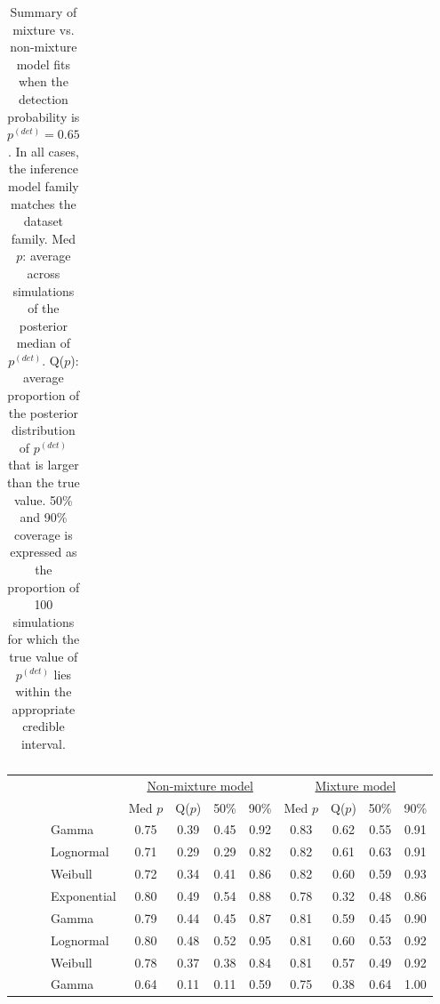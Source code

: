\documentclass[useAMS,usenatbib,referee,12pt]{article}
\newcommand{\pdet}{p^{(det)}}
\begin{document}
\begin{table}[ht]
\begin{tabular}{l|l|l|l|cccc|cccc}
   \hline
\end{tabular}
\caption{Summary of mixture vs. non-mixture model fits when the detection probability is $\pdet =0.65$.  
In all cases, the inference model family matches the dataset family.  
Med $p$: average across simulations of the posterior median of $\pdet$.  
Q($p$): average proportion of the posterior distribution of $\pdet$ that is larger than the true value.  
50\% and 90\% coverage is expressed as the proportion of 100 simulations for which the true value of $\pdet$ lies within the appropriate credible interval.}
\label{tbl:mix65}
\end{table}



\begin{table}[ht]\centering\footnotesize
\begin{tabular}{l|l|l|l|cccc|cccc}
 \multicolumn{4}{c|}{ } & \multicolumn{4}{c|}{\underline{Non-mixture model}} & \multicolumn{4}{c}{\underline{Mixture model}} \\
 \multicolumn{4}{c|}{ } & Med $p$ & Q($p$) & 50\% & 90\% & Med $p$ & Q($p$) & 50\% & 90\% \\ 
  \hline
  \hline
 \parbox[t]{2mm}{} & \parbox[t]{2mm}{} & \parbox[t]{2mm}{} & Gamma & 0.75 & 0.39 & 0.45 & 0.92 & 0.83 & 0.62 & 0.55 & 0.91 \\ 
   &  &  & Lognormal & 0.71 & 0.29 & 0.29 & 0.82 & 0.82 & 0.61 & 0.63 & 0.91 \\ 
   &  &  & Weibull & 0.72 & 0.34 & 0.41 & 0.86 & 0.82 & 0.60 & 0.59 & 0.93 \\ 
    &  &  & Exponential & 0.80 & 0.49 & 0.54 & 0.88 & 0.78 & 0.32 & 0.48 & 0.86 \\ 
 & & \parbox[t]{2mm}{} & Gamma & 0.79 & 0.44 & 0.45 & 0.87 & 0.81 & 0.59 & 0.45 & 0.90 \\ 
   &  &  & Lognormal & 0.80 & 0.48 & 0.52 & 0.95 & 0.81 & 0.60 & 0.53 & 0.92 \\ 
   &  &  & Weibull & 0.78 & 0.37 & 0.38 & 0.84 & 0.81 & 0.57 & 0.49 & 0.92 \\ 
& \parbox[t]{2mm}{} & \parbox[t]{2mm}{} & Gamma & 0.64 & 0.11 & 0.11 & 0.59 & 0.75 & 0.38 & 0.64 & 1.00 \\ 

\end{tabular}
\end{table}
\end{document}
